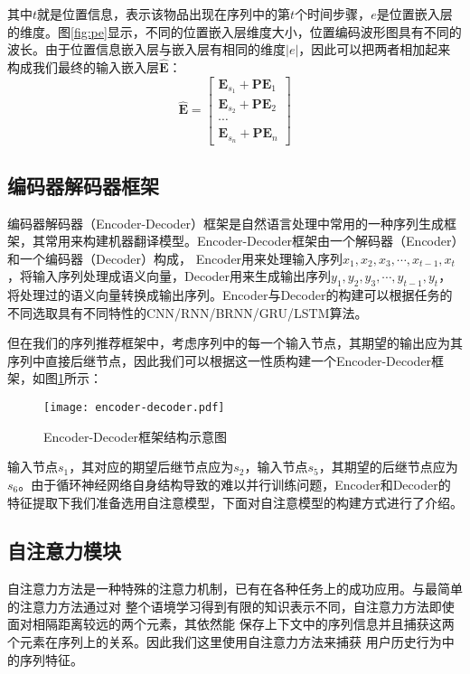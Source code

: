 其中$t$就是位置信息，表示该物品出现在序列中的第$t$个时间步骤，$e$是位置嵌入层的维度。图\ref{fig:pe}显示，不同的位置嵌入层维度大小，位置编码波形图具有不同的波长。由于位置信息嵌入层与嵌入层有相同的维度$|e|$，因此可以把两者相加起来构成我们最终的输入嵌入层$\widehat{\mathbf{E}}$：
\begin{equation}
	\widehat{\mathbf{E}}=\left[ \begin{array}{c}{\mathbf{E}_{s_{1}}+\mathbf{PE}_{1}} \\ 
	{\mathbf{E}_{s_{2}}+\mathbf{PE}_{2}} \\ 
	\cdots \\
	{\mathbf{E}_{s_{n}}+\mathbf{PE}_{n}}\end{array}\right]
\end{equation}

\subsection{编码器解码器框架}
编码器解码器（Encoder-Decoder）框架是自然语言处理中常用的一种序列生成框架，其常用来构建机器翻译模型。Encoder-Decoder框架由一个解码器（Encoder）和一个编码器（Decoder）构成，
Encoder用来处理输入序列$x_{1},x_{2},x_{3},\cdots ,x_{t-1},x_{t}$，将输入序列处理成语义向量，Decoder用来生成输出序列$y_{1},y_{2},y_{3},\cdots ,y_{t-1},y_{t}$，将处理过的语义向量转换成输出序列。Encoder与Decoder的构建可以根据任务的不同选取具有不同特性的CNN/RNN/BRNN/GRU/LSTM算法。


但在我们的序列推荐框架中，考虑序列中的每一个输入节点，其期望的输出应为其序列中直接后继节点，因此我们可以根据这一性质构建一个Encoder-Decoder框架，如图\ref{encoder}所示：
\begin{figure}[htbp]
\centering
\texttt{[image: encoder-decoder.pdf]} %
\caption{Encoder-Decoder框架结构示意图}
\label{encoder}
\end{figure}
输入节点$s_{1}$，其对应的期望后继节点应为$s_{2}$，输入节点$s_{5}$，其期望的后继节点应为$s_{6}$。由于循环神经网络自身结构导致的难以并行训练问题，Encoder和Decoder的特征提取下我们准备选用自注意模型，下面对自注意模型的构建方式进行了介绍。

\subsection{自注意力模块}

自注意力方法是一种特殊的注意力机制，已有在各种任务上的成功应用。与最简单的注意力方法通过对%
整个语境学习得到有限的知识表示不同，自注意力方法即使面对相隔距离较远的两个元素，其依然能%
保存上下文中的序列信息并且捕获这两个元素在序列上的关系。因此我们这里使用自注意力方法来捕获%
用户历史行为中的序列特征。

